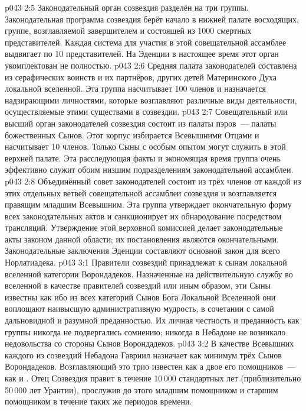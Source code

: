 \vs p043 2:5 \pc Законодательный орган созвездия разделён на три группы. Законодательная программа созвездия берёт начало в нижней палате восходящих, группе, возглавляемой завершителем и состоящей из 1000 смертных представителей. Каждая система для участия в этой совещательной ассамблее выдвигает по 10 представителей. На Эденции в настоящее время этот орган укомплектован не полностью.
\vs p043 2:6 Средняя палата законодателей составлена из серафических воинств и их партнёров, других детей Материнского Духа локальной вселенной. Эта группа насчитывает 100 членов и назначается надзирающими личностями, которые возглавляют различные виды деятельности, осуществляемые этими существами в созвездии.
\vs p043 2:7 Совещательный или высший орган законодателей созвездия состоит из палаты пэров~--- палаты божественных Сынов. Этот корпус избирается Всевышними Отцами и насчитывает 10 членов. Только Сыны с особым опытом могут служить в этой верхней палате. Эта расследующая факты и экономящая время группа очень эффективно служит обоим низшим подразделениям законодательной ассамблеи.
\vs p043 2:8 Объединённый совет законодателей состоит из трёх членов от каждой из этих отдельных ветвей совещательной ассамблеи созвездия и возглавляется правящим младшим Всевышним. Эта группа утверждает окончательную форму всех законодательных актов и санкционирует их обнародование посредством трансляций. Утверждение этой верховной комиссией делает законодательные акты законом данной области; их постановления являются окончательными. Законодательные заключения Эденции составляют основной закон для всего Норлатиадека.
\vs p043 3:1 Правители созвездий принадлежат к сынам локальной вселенной категории Ворондадеков. Назначенные на действительную службу во вселенной в качестве правителей созвездий или иным образом, эти Сыны известны как  ибо из всех категорий Сынов Бога Локальной Вселенной они воплощают наивысшую административную мудрость, в сочетании с самой дальновидной и разумной преданностью. Их личная честность и преданность как группы никогда не подвергались сомнению; никогда в Небадоне не возникало недовольства со стороны Сынов Ворондадеков.
\vs p043 3:2 \pc В качестве Всевышних каждого из созвездий Небадона Гавриил назначает как минимум трёх Сынов Ворондадеков. Возглавляющий это трио известен как  а двое его помощников~--- как  и . Отец Созвездия правит в течение 10\,000 стандартных лет (приблизительно 50\,000 лет Урантии), прослужив до этого младшим помощником и старшим помощником в течение таких же периодов времени.
